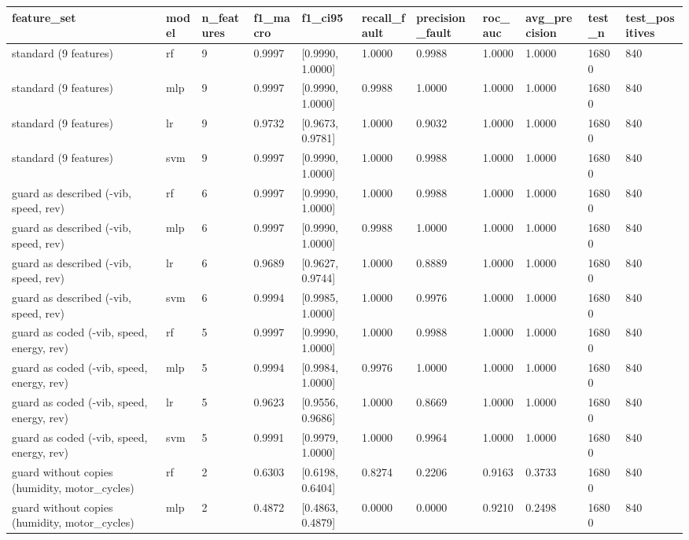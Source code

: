 \begin{tabular}{lllllllllll}
\toprule
feature\_set & model & n\_features & f1\_macro & f1\_ci95 & recall\_fault & precision\_fault & roc\_auc & avg\_precision & test\_n & test\_positives \\
\midrule
standard (9 features) & rf & 9 & 0.9997 & [0.9990, 1.0000] & 1.0000 & 0.9988 & 1.0000 & 1.0000 & 16800 & 840 \\
standard (9 features) & mlp & 9 & 0.9997 & [0.9990, 1.0000] & 0.9988 & 1.0000 & 1.0000 & 1.0000 & 16800 & 840 \\
standard (9 features) & lr & 9 & 0.9732 & [0.9673, 0.9781] & 1.0000 & 0.9032 & 1.0000 & 1.0000 & 16800 & 840 \\
standard (9 features) & svm & 9 & 0.9997 & [0.9990, 1.0000] & 1.0000 & 0.9988 & 1.0000 & 1.0000 & 16800 & 840 \\
guard as described (-vib, speed, rev) & rf & 6 & 0.9997 & [0.9990, 1.0000] & 1.0000 & 0.9988 & 1.0000 & 1.0000 & 16800 & 840 \\
guard as described (-vib, speed, rev) & mlp & 6 & 0.9997 & [0.9990, 1.0000] & 0.9988 & 1.0000 & 1.0000 & 1.0000 & 16800 & 840 \\
guard as described (-vib, speed, rev) & lr & 6 & 0.9689 & [0.9627, 0.9744] & 1.0000 & 0.8889 & 1.0000 & 1.0000 & 16800 & 840 \\
guard as described (-vib, speed, rev) & svm & 6 & 0.9994 & [0.9985, 1.0000] & 1.0000 & 0.9976 & 1.0000 & 1.0000 & 16800 & 840 \\
guard as coded (-vib, speed, energy, rev) & rf & 5 & 0.9997 & [0.9990, 1.0000] & 1.0000 & 0.9988 & 1.0000 & 1.0000 & 16800 & 840 \\
guard as coded (-vib, speed, energy, rev) & mlp & 5 & 0.9994 & [0.9984, 1.0000] & 0.9976 & 1.0000 & 1.0000 & 1.0000 & 16800 & 840 \\
guard as coded (-vib, speed, energy, rev) & lr & 5 & 0.9623 & [0.9556, 0.9686] & 1.0000 & 0.8669 & 1.0000 & 1.0000 & 16800 & 840 \\
guard as coded (-vib, speed, energy, rev) & svm & 5 & 0.9991 & [0.9979, 1.0000] & 1.0000 & 0.9964 & 1.0000 & 1.0000 & 16800 & 840 \\
guard without copies (humidity, motor\_cycles) & rf & 2 & 0.6303 & [0.6198, 0.6404] & 0.8274 & 0.2206 & 0.9163 & 0.3733 & 16800 & 840 \\
guard without copies (humidity, motor\_cycles) & mlp & 2 & 0.4872 & [0.4863, 0.4879] & 0.0000 & 0.0000 & 0.9210 & 0.2498 & 16800 & 840 \\

\end{tabular}

